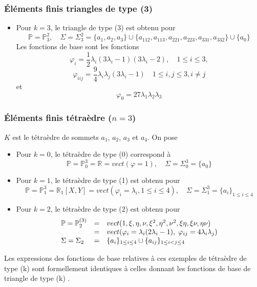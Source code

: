 \documentclass{beamer}
\begin{document}
\begin{frame}
\frametitle{Éléments finis triangles de type (3)}
\begin{itemize}


\item  Pour $k=3$, le triangle de type (3) est obtenu pour
 \[\mathbb{P}=\mathbb{P}_3^2,\quad \Sigma=\Sigma_3^2 = \{a_1,a_2,a_3\}\cup \{a_{112},a_{113},a_{221},a_{223},a_{331},a_{332}\}\cup \{a_{0}\}\]
Les fonctions de base sont les fonctions
\[\varphi_i=\frac 12\lambda_i(3\lambda_i-1)(3\lambda_i-2), \quad 1\leq  i  \leq 3,\] 
\[\varphi_{iij}=\frac 94\lambda_i\lambda_j(3\lambda_i-1) \quad 1\leq  i,j  \leq 3, i\neq j\]
et
  \[\varphi_0 = 27\lambda_1\lambda_2\lambda_3\]
\end{itemize}
\begin{center}
 \end{center}

\end{frame}
\begin{frame}
\frametitle{Éléments finis tétraèdre ($n=3$)}
$K$ est le tétraèdre de sommets $a_1$, $a_2$, $a_3$ et $a_4$. On pose
\begin{itemize}
\item Pour $k=0$, le tétraèdre de type (0) correspond à
\[ \mathbb{P} = \mathbb{P}_0^3=\mathbb{R}=vect(\varphi=1), \quad \Sigma=\Sigma_0^3 = \{a_0\}\]
\item  Pour $k = 1$, le tétraèdre de type (1) est obtenu pour
\[\mathbb{P}=\mathbb{P}_1^3=\mathbb{R}_1[X,Y]=vect(\varphi_i=\lambda_i,1\leq i\leq 4),\quad \Sigma=\Sigma_1^3 = \{a_i\}_{1\leq i\leq 4}\]
\item   Pour $k=2$, le tétraèdre de type (2) est obtenu pour
\[\begin{array}{l  cl}
\mathbb{P}=\mathbb{P}_2^{(3)}&=&vect(1,\xi,\eta,\nu,\xi^2,\eta^2,\nu^2,\xi\eta,\xi\nu,\eta\nu)\\
&=&vect(\varphi_i=\lambda_i(2\lambda_i-1),\; \varphi_{ij}=4\lambda_i\lambda_j)\\
\Sigma=\Sigma_2 &=& \{a_i\}_{1\leq i\leq 4}\cup \{a_{ij}\}_{1\leq i<j\leq 4}
\end{array}
\]
\end{itemize}
Les expressions des fonctions de base relatives à ces exemples de tétraèdre de type (k) sont formellement identiques à celles donnant les fonctions de base de triangle de type (k) .

\end{frame}
\end{document}
